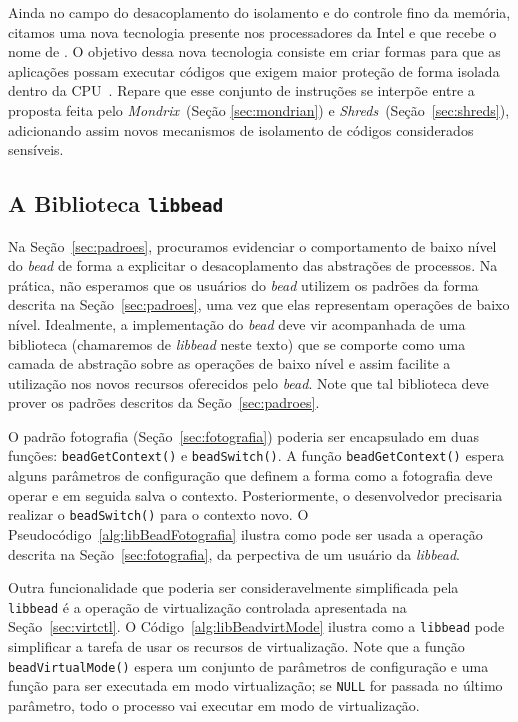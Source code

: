 Ainda no campo do desacoplamento do isolamento e do controle fino da memória,
citamos uma nova tecnologia presente nos processadores da Intel e que recebe o
nome de . O objetivo dessa nova
tecnologia consiste em criar formas para que as aplicações possam executar
códigos que exigem maior proteção de forma isolada dentro da
CPU~\citep{intelsgx}. Repare que esse conjunto de instruções se interpõe entre
a proposta feita pelo \emph{Mondrix}~(Seção \ref{sec:mondrian}) e
\emph{Shreds}~(Seção~\ref{sec:shreds}), adicionando assim novos mecanismos de
isolamento de códigos considerados sensíveis.

\subsection{A Biblioteca \texttt{libbead}}

Na Seção~\ref{sec:padroes}, procuramos evidenciar o comportamento de baixo
nível do \emph{bead} de forma a explicitar o desacoplamento das abstrações de
processos. Na prática, não esperamos que os usuários do \emph{bead} utilizem os
padrões da forma descrita na Seção~\ref{sec:padroes}, uma vez que elas
representam operações de baixo nível. Idealmente, a implementação do
\emph{bead} deve vir acompanhada de uma biblioteca (chamaremos de
\emph{libbead} neste texto) que se comporte como uma camada de abstração sobre
as operações de baixo nível e assim facilite a utilização nos novos recursos
oferecidos pelo \emph{bead}. Note que tal biblioteca deve prover os padrões
descritos da Seção~\ref{sec:padroes}.

O padrão fotografia (Seção~\ref{sec:fotografia}) poderia ser encapsulado em
duas funções: \texttt{beadGetContext()} e \texttt{beadSwitch()}. A função
\texttt{beadGetContext()} espera alguns parâmetros de configuração que definem a
forma como a fotografia deve operar e em seguida salva o contexto.
Posteriormente, o desenvolvedor precisaria realizar o \texttt{beadSwitch()}
para o contexto novo. O Pseudocódigo~\ref{alg:libBeadFotografia} ilustra como
pode ser usada a operação descrita na Seção~\ref{sec:fotografia}, da perpectiva
de um usuário da \emph{libbead}.



Outra funcionalidade que poderia ser consideravelmente simplificada pela
\texttt{libbead} é a operação de virtualização controlada apresentada na
Seção~\ref{sec:virtctl}. O Código~\ref{alg:libBeadvirtMode} ilustra como a
\texttt{libbead} pode simplificar a tarefa de usar os recursos de
virtualização. Note que a função \texttt{beadVirtualMode()} espera um conjunto
de parâmetros de configuração e uma função para ser executada em modo
virtualização; se \texttt{NULL} for passada no último parâmetro, todo o
processo vai executar em modo de virtualização.

